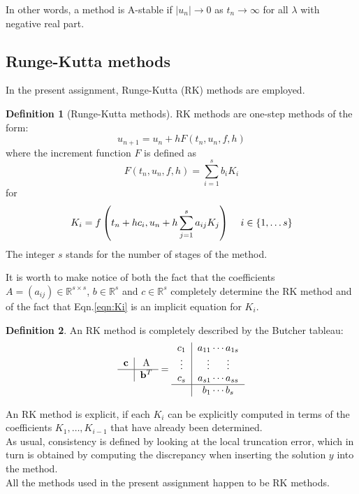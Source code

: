 \documentclass[11pt]{article}
\theoremstyle{theorem}
\theoremstyle{definition}
\newtheorem{definition}{Definition}
\begin{document}
In other words, a method is A-stable if $|u_n|\rightarrow 0$ as $t_n\rightarrow\infty$ for all $\lambda$ with negative real part.\\

\subsection{Runge-Kutta methods}
In the present assignment, Runge-Kutta (RK) methods are employed.\\
\begin{definition}[Runge-Kutta methods]
	\label{def:RK}
	RK methods are one-step methods of the form:
	$$u_{n+1}=u_n + hF(t_n, u_n, f, h)$$
	where the increment function $F$ is defined as
	$$F(t_n, u_n, f, h)=\sum_{i=1}^{s}b_iK_i$$
	for
	\begin{align}
		\label{eqn:Ki}
		K_i=f\left(t_n + hc_i, u_n + h\sum_{j=1}^{s}a_{ij}K_j\right)\hspace{4mm}i\in\lbrace1,\dots s\rbrace
	\end{align}
	The integer $s$ stands for the number of stages of the method.\\
\end{definition}

It is worth to make notice of both the fact that the coefficients $A=(a_{ij})\in\mathbb{R}^{s\times s}$, $b\in\mathbb{R}^s$ and $c\in\mathbb{R}^s$ completely determine the RK method and of the fact that Eqn.\eqref{eqn:Ki} is an implicit equation for $K_i$.\\
\begin{definition}
	\label{def:Butcher-tableau}
	An RK method is completely described by the Butcher tableau:\\
		\begin{align*}
			\begin{tabular}{c|c}
			$\mathbf{c}$ & A  \\
			\hline
			& $\mathbf{b}^T$ \\
			\end{tabular}
			=
			\begin{tabular}{c|c}
			$c_1$ & $a_{11}\cdots a_{1s}$  \\
			$\vdots$ & \vdots\hspace{5mm} \vdots \\
			$c_s$ & $a_{s1}\cdots a_{ss}$ \\
			\hline
			& $b_1\cdots b_s$ \\
			\end{tabular}
		\end{align*}
	
\end{definition}
An RK method is explicit, if each $K_i$ can be explicitly computed in terms of the coefficients $K_1,\dots ,K_{i-1}$ that have already been determined.\\
As usual, consistency is defined by looking at the local truncation error, which in turn
is obtained by computing the discrepancy when inserting the solution $y$ into the method.\\
All the methods used in the present assignment happen to be RK methods.\\
\end{document}
